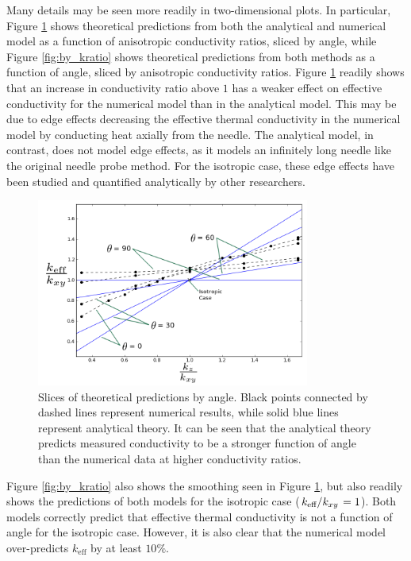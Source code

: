Many details may be seen more readily in two-dimensional plots. In particular,
Figure \ref{fig:by_angle} shows theoretical predictions from both the analytical
and numerical model as a function of anisotropic conductivity ratios, sliced by
angle, while Figure \ref{fig:by_kratio} shows theoretical predictions from both
methods as a function of angle, sliced by anisotropic conductivity ratios.
Figure \ref{fig:by_angle} readily shows that an increase in conductivity ratio
above \(1\) has a weaker effect on effective conductivity for the numerical
model than in the analytical model. This may be due to edge effects decreasing
the effective thermal conductivity in the numerical model by conducting heat
axially from the needle. The analytical model, in contrast, does not model edge
effects, as it models an infinitely long needle like the
original needle probe method. For the isotropic case, these edge effects have
been studied and quantified analytically by other researchers. \cite{axialerror}

\begin{figure}[h]
\centering
\includegraphics[width=0.8\textwidth]{fig/byAngle.png}
\caption{Slices of theoretical predictions by angle. Black points connected by dashed lines represent numerical results, while solid blue lines represent analytical theory. It can be seen that the analytical theory predicts measured conductivity to be a stronger function of angle than the numerical data at
higher conductivity ratios.}
\label{fig:by_angle}
\end{figure}

Figure \ref{fig:by_kratio} also shows the smoothing seen in Figure 
\ref{fig:by_angle}, but also readily shows the predictions of both models for
the isotropic case (\(\left.{k_{\textrm{eff}}}\middle/{k_{xy}}\right. = 1\)). Both models
correctly predict that effective thermal conductivity is not a function of angle
for the isotropic case. However, it is also clear that the numerical model
over-predicts \(k_{\textrm{eff}}\) by at least \(10\%\). 

